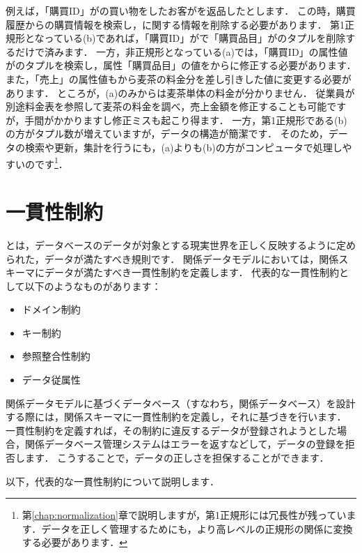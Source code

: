 例えば，「購買ID」がの買い物をしたお客がを返品したとします．
この時，購買履歴からの購買情報を検索し，に関する情報を削除する必要があります．
第1正規形となっている(b)であれば，「購買ID」がで「購買品目」がのタプルを削除するだけで済みます．
一方，非正規形となっている(a)では，「購買ID」の属性値がのタプルを検索し，属性「購買品目」の値をからに修正する必要があります．
また，「売上」の属性値もから麦茶の料金分を差し引きした値に変更する必要があります．
ところが，(a)のみからは麦茶単体の料金が分かりません．
従業員が別途料金表を参照して麦茶の料金を調べ，売上金額を修正することも可能ですが，手間がかかりますし修正ミスも起こり得ます．
一方，第1正規形である(b)の方がタプル数が増えていますが，データの構造が簡潔です．
そのため，データの検索や更新，集計を行うにも，(a)よりも(b)の方がコンピュータで処理しやすいのです\footnote{第\ref{chap:normalization}章で説明しますが，第1正規形には冗長性が残っています．データを正しく管理するためにも，より高レベルの正規形の関係に変換する必要があります．}．


\section{一貫性制約}
 とは，データベースのデータが対象とする現実世界を正しく反映するように定められた，データが満たすべき規則です．
関係データモデルにおいては，関係スキーマにデータが満たすべき一貫性制約を定義します．
代表的な一貫性制約として以下のようなものがあります\cite{Codd1972}：
\begin{itemize}
\item ドメイン制約
\item キー制約
\item 参照整合性制約
\item データ従属性
\end{itemize}

関係データモデルに基づくデータベース（すなわち，関係データベース）を設計する際には，関係スキーマに一貫性制約を定義し，それに基づきを行います．
一貫性制約を定義すれば，その制約に違反するデータが登録されようとした場合，関係データベース管理システムはエラーを返すなどして，データの登録を拒否します．
こうすることで，データの正しさを担保することができます．

以下，代表的な一貫性制約について説明します．



